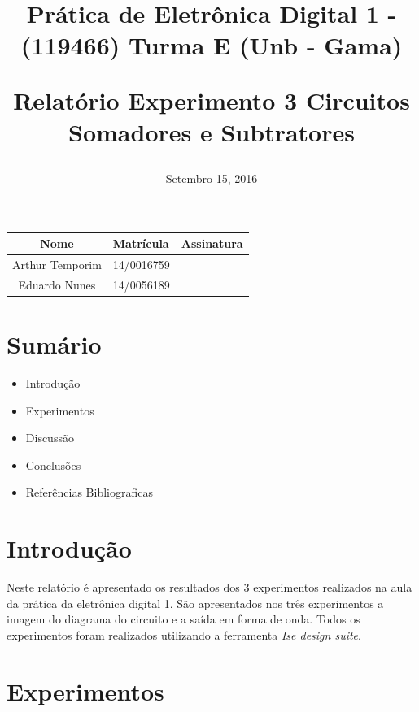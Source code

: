 \documentclass[12pts]{article}
\title{
	Prática de Eletrônica Digital 1 - (119466)
	\singlespacing
		Turma E (Unb - Gama)
	\singlespacing
	\begin{midpage}
	\begin {large}
		Relatório Experimento 3 
		\singlespace
		Circuitos Somadores e Subtratores
	\end {large}
	\end{midpage}
}
\date{Setembro 15, 2016}
\begin{document}
\maketitle	
\begin{center}

\begin{tabular}{|c|l|r|}
\hline
Nome & Matrícula & Assinatura\\
\hline
Arthur Temporim & 14/0016759 & \\
\hline	
Eduardo Nunes & 14/0056189 & \\
\hline	
\end{tabular}

\end{center}


\newpage

\section{Sumário}

\begin{itemize}
	\item Introdução
	\singlespacing
	\item Experimentos
	\singlespacing
	\item Discussão
	\singlespacing
	\item Conclusões 
	\singlespacing
	\item Referências Bibliograficas
	\singlespacing
\end{itemize}

\newpage


\section{Introdução}

	Neste relatório é apresentado os resultados dos 3 experimentos realizados na aula da prática da eletrônica digital 1.
	São apresentados nos três experimentos a imagem do diagrama do circuito e a saída em forma de onda. Todos os experimentos foram realizados utilizando a ferramenta \textit{Ise design suite}.

\section{Experimentos}

\end{document}
